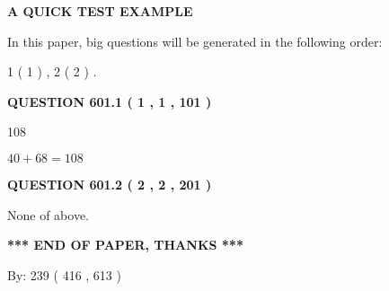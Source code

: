\documentclass[12pt]{article}
\begin{document}
   
   
   
   
   
 \vspace{0.2in}
{\LARGE {\textbf{ A QUICK TEST EXAMPLE}}}
   
   
   
\vspace{0.2in}
   
In this paper, big questions will be generated in the following order: 
   
   
   1 ( 1 )
 ,
   2 ( 2 )
 .
  
\vspace{0.2in}
  
{\textbf{\Large{QUESTION
601.1 
 ( 1 , 1 , 101 )
}}}
  
  
 
 
\noindent{}

108
 
 
 
 
\noindent{}

$ %
40 +  %
68=   %
108$
 
 
  
\vspace{0.2in}
  
{\textbf{\Large{QUESTION
601.2 
 ( 2 , 2 , 201 )
}}}
  
  
 
 
\noindent{}
 
 
 None of above.
 
 
 
 
   
   
 \vspace{0.2in}
 
   
   
   
   
\vspace{1.0in} 
{\textbf{\large{ *** END OF PAPER, THANKS *** }}} 
   
   
\hspace{1.0in} By: 
 239 ( 416 ,  613 )
   
   
   
   
\newpage 
\setcounter{page}{ 
   602001 } 
   
   
   
\end{document}
